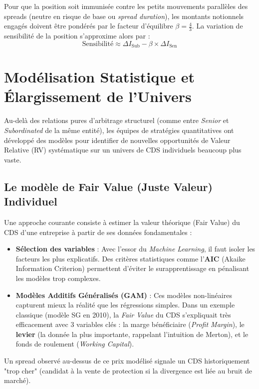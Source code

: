 Pour que la position soit immunisée contre les petits mouvements parallèles des spreads (neutre en risque de base ou \textit{spread duration}), les montants notionnels engagés doivent être pondérés par le facteur d'équilibre $\beta = \frac{4}{3}$. La variation de sensibilité de la position s'approxime alors par :
\begin{equation}
    \text{Sensibilité} \approx \Delta I_{\text{Sub}} - \beta \times \Delta I_{\text{Sen}}
\end{equation}

\section{Modélisation Statistique et Élargissement de l'Univers}

Au-delà des relations pures d'arbitrage structurel (comme entre \textit{Senior} et \textit{Subordinated} de la même entité), les équipes de stratégies quantitatives ont développé des modèles pour identifier de nouvelles opportunités de Valeur Relative (RV) systématique sur un univers de CDS individuels beaucoup plus vaste.

\subsection{Le modèle de Fair Value (Juste Valeur) Individuel}

Une approche courante consiste à estimer la valeur théorique (Fair Value) du CDS d'une entreprise à partir de ses données fondamentales :
\begin{itemize}
    \item \textbf{Sélection des variables} : Avec l'essor du \textit{Machine Learning}, il faut isoler les facteurs les plus explicatifs. Des critères statistiques comme l'\textbf{AIC} (Akaike Information Criterion) permettent d'éviter le surapprentissage en pénalisant les modèles trop complexes.
    \item \textbf{Modèles Additifs Généralisés (GAM)} : Ces modèles non-linéaires capturent mieux la réalité que les régressions simples. Dans un exemple classique (modèle SG en 2010), la \textit{Fair Value} du CDS s'expliquait très efficacement avec 3 variables clés : la marge bénéficiaire (\textit{Profit Margin}), le \textbf{levier} (la donnée la plus importante, rappelant l'intuition de Merton), et le fonds de roulement (\textit{Working Capital}).
\end{itemize}
Un spread observé au-dessus de ce prix modélisé signale un CDS historiquement "trop cher" (candidat à la vente de protection si la divergence est liée au bruit de marché).

